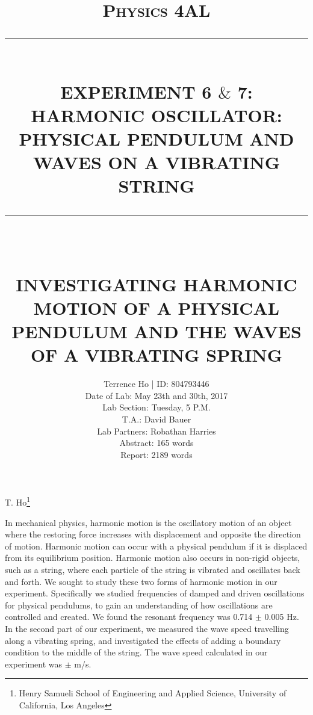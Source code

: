 \documentclass[11pt]{report}
\newcommand{\HRule}[1]{\rule{\linewidth}{#1}}
\begin{document}
\title{ \normalsize \textsc{Physics 4AL}
        \\ [2.0cm]
        \HRule{0.5pt} \\
        \LARGE \textbf{\uppercase{Experiment 6 $\&$ 7: Harmonic Oscillator:
        Physical Pendulum and Waves on a Vibrating String}}
        \HRule{2pt} \\ [0.5cm]
        \vspace*{2\baselineskip}}

\date{}

\author{
        Terrence Ho | ID: 804793446 \\ 
        Date of Lab: May 23th and 30th, 2017 \\
        Lab Section: Tuesday, 5 P.M.\\
        T.A.: David Bauer\\
        Lab Partners: Robathan Harries \\
        Abstract: 165 words\\
        Report: 2189 words\\
    }
\maketitle
\tableofcontents
\newpage

\sectionfont{\scshape}

\begin{center}
\title{
    \Large \textbf{\uppercase{Investigating Harmonic Motion of a Physical
    Pendulum and the Waves of a vibrating spring}}
}


T. Ho\footnote{Henry Samueli School of Engineering and Applied Science,
University of California, Los Angeles}
\end{center}

In mechanical physics, harmonic motion is the oscillatory motion of an object
where the restoring force increases with displacement and opposite the direction
of motion.  Harmonic motion can occur with a physical pendulum if it is
displaced from its equilibrium position.  Harmonic motion also occurs in
non-rigid objects, such as a string, where each particle of the string is
vibrated and oscillates back and forth. We sought to study these two forms of
harmonic motion in our experiment.  Specifically we studied frequencies of
damped and driven oscillations for physical pendulums, to gain an understanding
of how oscillations are controlled and created.  We found the resonant frequency
was 0.714 $\pm$ 0.005 Hz.  In the second part of our experiment, we measured the
wave speed travelling along a vibrating spring, and investigated the effects of
adding a boundary condition to the middle of the string. The wave speed
calculated in our experiment was $\pm$ m/s.
\end{document}

